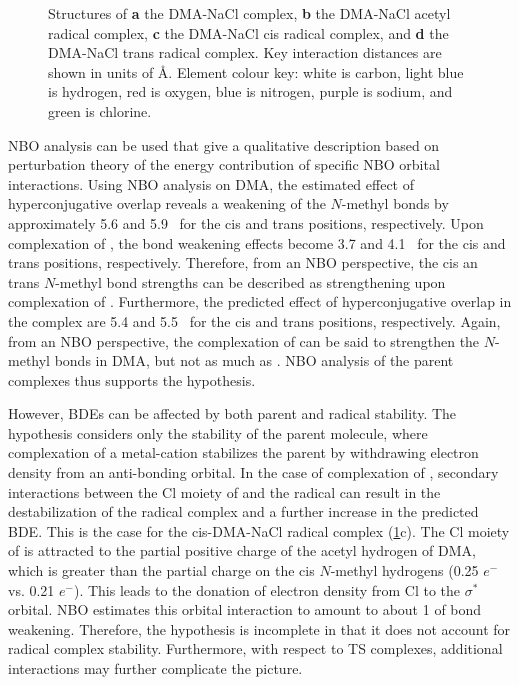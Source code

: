 \begin{doublespace}
\begin{figure}[!htbp]
\caption[Structures of the DMA-NaCl complex and associated radical
complexes.]{Structures of \textbf{a} the DMA-NaCl complex, \textbf{b} the
DMA-NaCl acetyl radical complex, \textbf{c} the DMA-NaCl cis
radical complex, and \textbf{d} the DMA-NaCl trans radical complex. Key
interaction distances are shown in units of \AA. Element colour key: white is
carbon, light blue is hydrogen, red is oxygen, blue is nitrogen, purple is
sodium, and green is chlorine.} \label{fig:dma-na-cl}
\end{figure}

NBO analysis can be used that give a qualitative description based on
perturbation theory of the energy contribution of specific NBO orbital
interactions.\cite{Weinhold2016} Using NBO analysis on DMA, the estimated effect
of hyperconjugative overlap reveals a weakening of the $N$-methyl  bonds
by approximately 5.6 and 5.9 \kcalmol\ for the cis and trans positions,
respectively. Upon complexation of , the bond weakening effects become
3.7 and 4.1 \kcalmol\ for the cis and trans positions, respectively. Therefore,
from an NBO perspective, the cis an trans $N$-methyl bond strengths can be
described as strengthening upon complexation of . Furthermore, the
predicted effect of hyperconjugative overlap in the  complex are
5.4 and 5.5 \kcalmol\ for the cis and trans positions, respectively. Again, from
an NBO perspective, the complexation of  can be said to strengthen the
$N$-methyl  bonds in DMA, but not as much as . NBO analysis of
the parent complexes thus supports the hypothesis.

However, BDEs can be affected by both parent and radical stability. The
hypothesis considers only the stability of the parent molecule, where
complexation of a metal-cation stabilizes the parent by withdrawing electron
density from an anti-bonding orbital. In the case of complexation of ,
secondary interactions between the Cl moiety of  and the radical can
result in the destabilization of the radical complex and a further increase in
the predicted  BDE. This is the case for the cis-DMA-NaCl radical
complex (\ref{fig:dma-na-cl}c). The Cl moiety of  is attracted to the
partial positive charge of the acetyl hydrogen of DMA, which is greater than the
partial charge on the cis $N$-methyl hydrogens (0.25 $e^-$ vs. 0.21 $e^-$). This
leads to the donation of electron density from Cl to the  $\sigma^*$
orbital. NBO estimates this orbital interaction to amount to about 1 \kcalmol of
bond weakening. Therefore, the hypothesis is incomplete in that it does not
account for radical complex stability. Furthermore, with respect to TS
complexes, additional interactions may further complicate the picture.


\end{doublespace}
